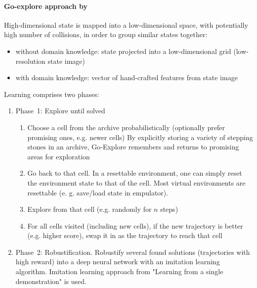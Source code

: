 \documentclass{article}
\begin{document}

\paragraph{Go-explore approach by~\citet{ecoffet_first_2021}} %
\label{par:go-explore}

High-dimensional state is mapped into a low-dimensional space, with potentially high number of collisions, in order to group similar states together:
\begin{itemize}
    \item without domain knowledge: state projected into a low-dimensional grid (low-resolution state image)
    \item with domain knowledge: vector of hand-crafted features from state image
\end{itemize}

Learning comprises two phases:
\begin{enumerate}
    \item Phase~1: Explore until solved
    \begin{enumerate}
      \item Choose a cell from the archive probabilistically (optionally prefer promising ones, e.g. newer cells)
    By explicitly storing a variety of stepping stones in an archive, Go-Explore remembers and returns to promising areas for exploration
      \item Go back to that cell. In a resettable environment, one can simply reset the environment state to that of the cell. Most virtual environments are resettable (e. g. save/load state in empulator).
      \item Explore from that cell (e.g. randomly for $n$ steps)
      \item For all cells visited (including new cells), if the new trajectory is better (e.g. higher score), swap it in as the trajectory to reach that cell
    \end{enumerate}

    \item Phase~2: Robustification. Robustify several found solutions (trajectories with high reward) into a deep neural network with an imitation learning algorithm. Imitation learning approach from "Learning from a single demonstration" is used.
\end{enumerate}

\end{document}
